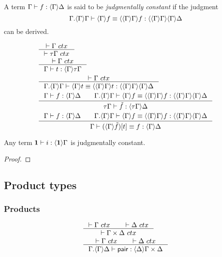 \begin{defn}
A term $\jhom{\Gamma}{\Delta}{f}$ is said to be \emph{judgmentally constant} if
the judgment
\begin{equation*}
\jtermeq{\ctxext{\Gamma}{\ctxwk{\Gamma}{\Gamma}}}{\ctxwk{{\Gamma}{\Gamma}}{{\Gamma}{\Delta}}}{\ctxwk{\Gamma}{f}}{\ctxwk{{\Gamma}{\Gamma}}{f}}
\end{equation*}
can be derived.
\end{defn}

\begin{defn}
\begin{align}
& \inference{\jctx{\Gamma}}{\jctx{\tau\Gamma}}\\
& \inference{\jctx{\Gamma}}{\jhom{\Gamma}{\tau\Gamma}{t}}\\
& \inference{\jctx{\Gamma}}{\jtermeq{\ctxext{\Gamma}{\ctxwk{\Gamma}{\Gamma}}}{\ctxwk{{\Gamma}{\Gamma}}{{\Gamma}{\Delta}}}{\ctxwk{\Gamma}{t}}{\ctxwk{{\Gamma}{\Gamma}}{t}}}\\
& \inference{\jhom{\Gamma}{\Delta}{f}\qquad\jtermeq{\ctxext{\Gamma}{\ctxwk{\Gamma}{\Gamma}}}{\ctxwk{{\Gamma}{\Gamma}}{{\Gamma}{\Delta}}}{\ctxwk{\Gamma}{f}}{\ctxwk{{\Gamma}{\Gamma}}{f}}}{\jhom{\tau\Gamma}{\Delta}{\tilde{f}}}\\
& \inference{\jhom{\Gamma}{\Delta}{f}\qquad\jtermeq{\ctxext{\Gamma}{\ctxwk{\Gamma}{\Gamma}}}{\ctxwk{{\Gamma}{\Gamma}}{{\Gamma}{\Delta}}}{\ctxwk{\Gamma}{f}}{\ctxwk{{\Gamma}{\Gamma}}{f}}}
{\jtermeq{\Gamma}{\ctxwk{\Gamma}{\Delta}}{\jcomp{\Gamma}{t}{\tilde{f}}}{f}}
\end{align}
\end{defn}

\begin{lem}
Any term $\jhom{\unit}{\Gamma}{i}$ is judgmentally constant.
\end{lem}

\begin{proof}

\end{proof}

\subsection{Product types}

\subsubsection{Products}
\begin{align}
& \inference{\jctx{\Gamma}\qquad\jctx{\Delta}}{\jctx{\product{\Gamma}{\Delta}}}\\
& \inference{\jctx{\Gamma}\qquad\jctx{\Delta}}{\jhom{{\Gamma}{\Delta}}{\product{\Gamma}{\Delta}}{\pair}}
\end{align}

